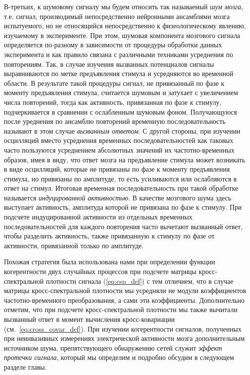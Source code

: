 В-третьих, к шумовому сигналу мы будем относить так называемый \emph{шум мозга}, т.е.
сигнал, производимый непосредственно нейронными ансамблями мозга испытуемого,
но не относящийся непосредственно к физеологическому явлению, изучаемому в эксперименте.
При этом, шумовая компонента мозгового сигнала определяется по-разному в зависимости от
процедуры обработки данных эксперимента и как правило связана с различными техниками усреднения
по повторениям.
Так, в случае изучения вызванных потенциалов сигналы выравниваются по метке предъявления стимула и
усредняются во временной области. В результате такой процедуры сигнал, не привязанный по фазе к
моменту предъявления стимула, считается шумовым и затухает с увеличением числа повторений,
тогда как активность, привязанная по фазе к стимулу, подчеркивается в сравнении с ослабленным шумовым фоном.
Получающуюся после уреднения по ансамблю повторений временную
последовательность называют в этом случае \emph{вызванным ответом}.
С другой стороны, при изучении осцилляций вместо усреднения временных последовательностей как таковых
часто пользуются усреднением абсолютных значений их частотно-временных образов,
имея в виду, что ответ мозга на предъявление стимула может возникать в виде осцилляций,
которые не привязаны по фазе к моменту предъявления стимула,
но привязаны по амплитуде, то есть усиливаются или ослабляются в ответ на стимул.
Итоговая временная последовательность при такой обработке называется \emph{индуцированной активностью}.
В качестве мозгового шума здесь выступает активность, амплитуда которой не привязана по фазе к стимулу.
При подсчете индуцированной активности из отдельных временных последовательностей для каждого повторения
часто вычетают вызванный ответ, чтобы разделить активность, также привязанную к стимулу по фазе от активности,
привязанной только по амплитуде.

Похожая стратегия была использована нами при определении функции когерентности двух случайных процессов при
подсчете матрицы кросс-спектральной плотности сигнала (\ref{eq:csp_def}) с тем отличием,
что в случае матрицы кросс-спектральной плотности мы усредняли не модули коэффициентов
частотно-временного преобразования, а сами эти коэффициенты.
Дополнительно отметим, что при подсчете кросс-спектральной плотности мы также вычитали вызванный ответ в
момент вычисления кросс-ковариации (см.~\ref{eq:cross_covar_def}). При изучении когерентности сигналов,
полученных при неинвазивных измерениях электрической активности мозга дополнительным источником шума,
препятствующего обнаружению сетей служит \emph{эффект протечки сигнала}, который мы определим и подробно
обсудим в следующем разделе главы.

